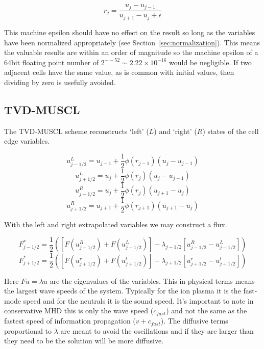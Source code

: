 \documentclass[12pt,upcase]{umlthesis}
\begin{document}
\begin{equation}
	r_j = \frac{u_j - u_{j-1}}{u_{j+1} - u_j + \epsilon}
\end{equation}

This machine epsilon should have no effect on the result so long as the variables have been normalized appropriately (see Section~\ref{sec:normalization}). This means the valuable results are within an order of magnitude so the machine epsilon of a 64bit floating point number of $2^{-−52} \sim 2.22 \times 10^{-16}$ would be negligible. If two adjacent cells have the same value, as is common with initial values, then dividing by zero is usefully avoided.

\subsection{TVD-MUSCL}\label{sec:tvd-muscl}

The TVD-MUSCL scheme reconstructs `left' ($L$) and `right' ($R$) states of the cell edge variables. 

\begin{equation}
	u^L_{j-1/2} = u_{j-1} + \frac{1}{2} \phi(r_{j-1}) (u_j - u_{j-1})
\end{equation}
\begin{equation}
	u^L_{j+1/2} = u_{j} + \frac{1}{2} \phi(r_{j}) (u_j - u_{j-1})
\end{equation}
\begin{equation}
	u^R_{j-1/2} = u_{j} + \frac{1}{2} \phi(r_{j}) (u_{j+1} - u_{j})
\end{equation}
\begin{equation}
	u^R_{j+1/2} = u_{j+1} + \frac{1}{2} \phi(r_{j+1}) (u_{j+1} - u_{j})
\end{equation}

With the left and right extrapolated variables we may construct a flux.

\begin{equation}
	F^*_{j-1/2} = \frac{1}{2} ([F(u^R_{j-1/2})+F(u^L_{j-1/2})] - \lambda_{j-1/2}[u^R_{j-1/2}-u^L_{j-1/2}])
\end{equation}
\begin{equation}
	F^*_{j+1/2} = \frac{1}{2} ([F(u^r_{j+1/2})+F(u^l_{j+1/2})] - \lambda_{j+1/2}[u^r_{j+1/2}-u^l_{j+1/2}])
\end{equation}

Here $F u = \lambda u$ are the eigenvalues of the variables. This in physical terms means the largest wave speeds of the system. Typically for the ion plasma it is the fast-mode speed and for the neutrals it is the sound speed. It's important to note in conservative MHD this is only the wave speed ($c_{fast}$) and not the same as the fastest speed of information propagation ($v+c_{fast}$). The diffusive terms proportional to $\lambda$ are meant to avoid the oscillations and if they are larger than they need to be the solution will be more diffusive.
\end{document}
